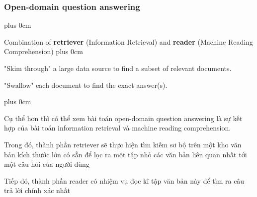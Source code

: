\documentclass[11pt]{beamer}
\renewcommand{\raggedright}{\leftskip=0pt \rightskip=0pt plus 0cm}
\let\olditemize=\itemize
\renewenvironment{itemize}{\olditemize\raggedright}{\endlist}
\begin{document}
\begin{frame}
	\frametitle{Open-domain question answering}
	\begin{itemize}
		\item Combination of \textbf{retriever} (Information Retrieval) and \textbf{reader} (Machine Reading Comprehension)
		\begin{itemize}
			\item "Skim through" a large data source to find a subset of relevant documents.
			\item "Swallow" each document to find the exact answer(s).
		\end{itemize}
	\end{itemize}
\end{frame}
\begin{frame}
\begin{itemize}
	\item Cụ thể hơn thì có thể xem bài toán open-domain question answering là sự kết hợp của bài toán information retrieval và machine reading comprehension.
	\item Trong đó, thành phần retriever sẽ thực hiện tìm kiếm sơ bộ trên một kho văn bản kích thước lớn có sẵn để lọc ra một tập nhỏ các văn bản liên quan nhất tới một câu hỏi của người dùng
	\item Tiếp đó, thành phần reader có nhiệm vụ đọc kĩ tập văn bản này để tìm ra câu trả lời chính xác nhất
\end{itemize}
\end{frame}
\end{document}
